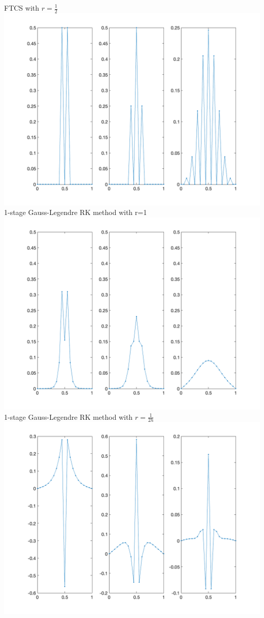 \documentclass{article}
\begin{document}
FTCS with $r=\frac{1}{2}$\\
\includegraphics[scale = 0.25]{FTCS_2.png}\\
1-stage Gauss-Legendre RK method with r=1\\
\includegraphics[scale = 0.25]{GS_1.png}\\
1-stage Gauss-Legendre RK method with $r=\frac{1}{2h}$\\
\includegraphics[scale = 0.25]{GS_2.png}\\
\end{document}
